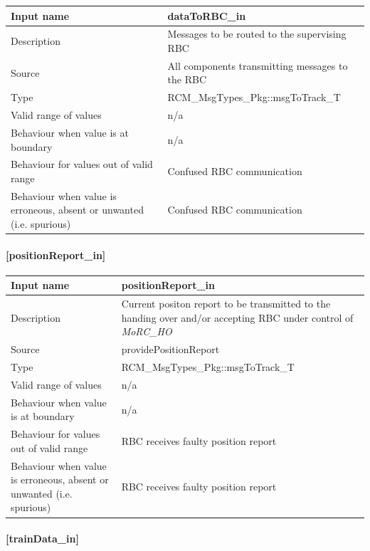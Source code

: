 \begin{longtable}{p{}p{}}
	\toprule
	Input name				& dataToRBC\_in \\
	\midrule
	Description				& Messages to be routed to the supervising RBC \\
	\midrule
	Source					& All components transmitting messages to the RBC \\ 
	\midrule
	Type					& RCM\_MsgTypes\_Pkg::msgToTrack\_T \\
	\midrule
	Valid range of values	& n/a \\
	\midrule
	Behaviour when value is at boundary	& n/a \\
	\midrule
	Behaviour for values out of valid range	& Confused RBC communication\\
	\midrule
	Behaviour when value is erroneous, absent or unwanted (i.e. spurious) & Confused RBC communication \\
	\bottomrule
\end{longtable}

\paragraph{[positionReport\_in]}

\begin{longtable}{p{}p{}}
	\toprule
	Input name				& positionReport\_in \\
	\midrule
	Description				& Current positon report to be transmitted to the handing over and/or accepting RBC under control of \emph{MoRC\_HO}\\
	\midrule
	Source					& providePositionReport \\ 
	\midrule
	Type					& RCM\_MsgTypes\_Pkg::msgToTrack\_T \\
	\midrule
	Valid range of values	& n/a \\
	\midrule
	Behaviour when value is at boundary	& n/a \\
	\midrule
	Behaviour for values out of valid range	& RBC receives faulty position report \\
	\midrule
	Behaviour when value is erroneous, absent or unwanted (i.e. spurious) & RBC receives faulty position report \\
	\bottomrule
\end{longtable}

\paragraph{[trainData\_in]}

